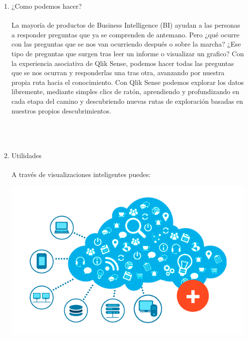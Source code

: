 \begin{enumerate}[1.]
                   Qlik Sense es una aplicaci\'on de visualizaci\'on y descubrimiento de datos gobernada, basada en servidor, ideal para las necesidades anal\'iticas de grupos, departmentos o toda una organizaci\'on. Los usuarios de negocio obtienen un an\'alisis de datos potente, flexible y personalizado y colaboraci\'on en cualquier dispositivo, a la vez que se adhieren a unas pol\'iticas de gobierno y seguridad centralizada de datos.\\
                  \\ 
              \item ¿Como podemos hacer?\\
               \\ 
               La mayor\'ia de productos de Business Intelligence (BI) ayudan a las personas a responder preguntas que ya se comprenden de antemano. Pero ¿qu\'e ocurre con las preguntas que se nos van ocurriendo despu\'es o sobre la marcha? ¿Ese tipo de preguntas que surgen tras leer un informe o visualizar un grafico? Con la experiencia asociativa de Qlik Sense, podemos hacer todas las preguntas que se nos ocurran y responderlas una tras otra, avanzando por nuestra propia ruta hacia el conocimiento. Con Qlik Sense podemos explorar los datos libremente, mediante simples clics de rat\'on, aprendiendo y profundizando en cada etapa del camino y descubriendo nuevas rutas de exploraci\'on basadas en nuestros propios descubrimientos.
              \\
              \\
               \\
               \\
              \item Utilidades \\
            \\
A trav\'es de visualizaciones inteligentes puedes: \\
             
                \begin{center}
                    \includegraphics[scale=0.60]{./Imagenes/caracteristicas.png}
                 \end{center}


\end{enumerate}
